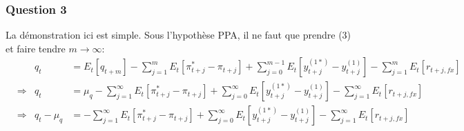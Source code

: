 \documentclass[letterpaper,11pt]{article}
\newcommand{\?}{\stackrel{?}{=}}
\newcommand{\macroA}[1]{y_{#1}^{(1*)}}
\newcommand{\macroB}[1]{y_{#1}^{(1)}}
\newcommand{\macroC}[1]{r_{#1,fx}}
\begin{document}
\subsubsection*{Question 3}
La démonstration ici est simple. Sous l'hypothèse PPA, il ne faut que prendre (3) et faire tendre $m \rightarrow \infty$:
\begin{equation*}
\begin{aligned}
    &&q_t &=E_t[q_{t+m}]-\sum_{j=1}^{m}E_t[\pi^*_{t+j}-\pi_{t+j}]+\sum_{j=0}^{m-1}E_t[\macroA{t+j}-\macroB{t+j}]-\sum_{j=1}^{m}E_t[\macroC{t+j}]\\
    &\Rightarrow& q_t &=\mu_q-\sum_{j=1}^{\infty}E_t[\pi^*_{t+j}-\pi_{t+j}]+\sum_{j=0}^{\infty}E_t[\macroA{t+j}-\macroB{t+j}]-\sum_{j=1}^{\infty}E_t[\macroC{t+j}]\\
        &\Rightarrow& q_t-\mu_q &=-\sum_{j=1}^{\infty}E_t[\pi^*_{t+j}-\pi_{t+j}]+\sum_{j=0}^{\infty}E_t[\macroA{t+j}-\macroB{t+j}]-\sum_{j=1}^{\infty}E_t[\macroC{t+j}]
\end{aligned}
\end{equation*}
\end{document}
